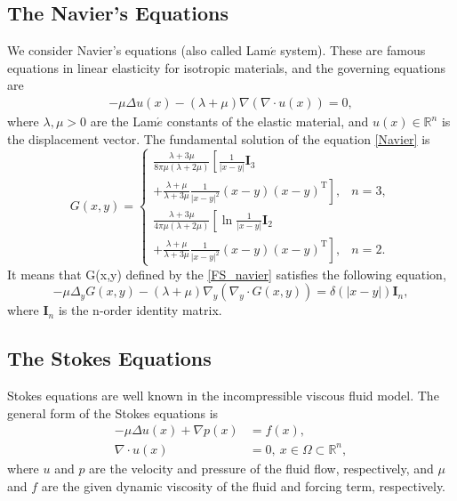 \documentclass[hyperref]{article}
\numberwithin{equation}{section}
\theoremstyle{nonumberplain}
\begin{document}
	\subsection{The Navier's Equations}
	We consider Navier's equations (also called Lam$\acute{e}$ system). These are famous equations in linear elasticity for isotropic materials, and the governing equations are
	\begin{equation}
		\begin{aligned}
			-\mu\Delta u(x) - (\lambda+\mu)\nabla(\nabla\cdot u(x)) = 0,
		\end{aligned}
		\label{Navier}
	\end{equation}
	where $\lambda,\mu>0$ are the Lam$\acute{e}$ constants of the elastic material, and $u(x)\in\mathbb{R}^n$ is the displacement vector. The fundamental solution of the equation \eqref{Navier} is 
	\begin{equation}
		G(x, y)=\left\{\begin{aligned}
			\frac{\lambda+3 \mu}{8 \pi \mu(\lambda+2 \mu)}\left[\frac{1}{|x-y|} \mathbf{I}_{3}\right.\\
			\left.+\frac{\lambda+\mu}{\lambda+3 \mu} \frac{1}{|x-y|^{2}}(x-y)(x-y)^{\mathrm{T}}\right], & n=3, \\
			\frac{\lambda+3 \mu}{4 \pi \mu(\lambda+2 \mu)}\left[\ln \frac{1}{|x-y|} \mathbf{I}_{2}\right.\\
			\left.+\frac{\lambda+\mu}{\lambda+3 \mu} \frac{1}{|x-y|^{2}}(x-y)(x-y)^{\mathrm{T}}\right], & n=2.
		\end{aligned}\right.
		\label{FS_navier}
	\end{equation}
	It means that G(x,y) defined by the \eqref{FS_navier} satisfies the following equation,
	\begin{equation}
		-\mu\Delta_y G(x,y) - (\lambda+\mu)\nabla_y(\nabla_y\cdot G(x,y)) = \delta(|x-y|)\mathbf{I}_n, 
	\end{equation}
	where $\mathbf{I}_n$ is the n-order identity matrix.
	
	\subsection{The Stokes Equations}
	Stokes equations are well known in the incompressible viscous fluid model. The general form of the Stokes equations is 
	\begin{equation}
		\begin{aligned}
			-\mu\Delta u(x)+\nabla p(x)&=f(x),\\
			\nabla\cdot u(x)&=0,\ x\in\Omega\subset\mathbb{R}^n,
		\end{aligned}
		\label{eq:stoke}
	\end{equation}
	where $u$ and $p$ are the velocity and pressure of the fluid flow, respectively, and $\mu$ and $f$ are the given dynamic viscosity of the fluid and forcing term, respectively. 
	
\end{document}
